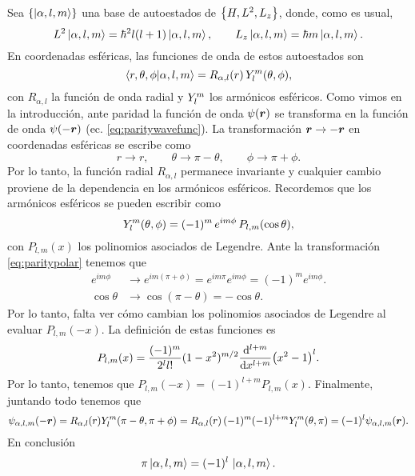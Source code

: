 \documentclass[10pt, a4paper]{article}
\newcommand{\Plmev}[2]{P_{#1,#2}}
\numberwithin{equation}{subsection}
\begin{document}
Sea $\set{\ket{\alpha,l,m}}$ una base de autoestados de $\set{H, L^2, L_z}$,
donde, como es usual,
\begin{equation}
  L^2\ket{\alpha,l,m} = \hbar^2l(l+1)\ket{\alpha,l,m}, \qquad
  L_z\ket{\alpha,l,m} = \hbar m\ket{\alpha,l,m}.
\end{equation}
En coordenadas esféricas, las funciones de onda de estos autoestados son
\begin{equation}
  \braket{r,\theta,\phi}{\alpha,l,m} =
  R_{\alpha,l}(r)\,\SphericalHarmonic{l}{m}(\theta,\phi),
\end{equation}
con $R_{\alpha,l}$ la función de onda radial y $\SphericalHarmonic{l}{m}$ los
armónicos esféricos. Como vimos en la introducción, ante paridad la función de
onda $\psi(\vb*{r})$ se transforma en la función de onda $\psi(-\vb*{r})$
(ec. \eqref{eq:paritywavefunc}). La transformación $\vb*{r} \rightarrow
-\vb*{r}$ en coordenadas esféricas se escribe como
\begin{equation} \label{eq:paritypolar}
  r \xrightarrow{\quad} r, \qquad
  \theta \xrightarrow{\quad} \pi - \theta, \qquad
  \phi \xrightarrow{\quad} \pi + \phi.
\end{equation}
Por lo tanto, la función radial $R_{\alpha,l}$ permanece invariante y cualquier
cambio proviene de la dependencia en los armónicos esféricos. Recordemos que
los armónicos esféricos se pueden escribir como
\begin{equation}
  \SphericalHarmonic{l}{m}(\theta,\phi) =
    (-1)^{m}\,e^{im\phi}\,\Plmev{l}{m}(\cos\theta),
\end{equation}
con $\Plmev{l}{m}(x)$ los polinomios asociados de Legendre. Ante la
transformación \eqref{eq:paritypolar} tenemos que
\begin{align}
  e^{im\phi} &\xrightarrow{\quad} e^{im(\pi + \phi)} = e^{im\pi}e^{im\phi} =
  (-1)^{m}e^{im\phi}. \\
  \cos\theta &\xrightarrow{\quad} \cos(\pi - \theta) = -\cos\theta.
\end{align}
Por lo tanto, falta ver cómo cambian los polinomios asociados de Legendre al
evaluar $\Plmev{l}{m}(-x)$. La definición de estas funciones es
\begin{equation}
  \Plmev{l}{m}(x) = \frac{(-1)^m}{2^ll!}(1-x^2)^{m/2} \dv[l+m]{x} (x^2 - 1)^l.
\end{equation}
Por lo tanto, tenemos que $\Plmev{l}{m}(-x) = (-1)^{l+m}\Plmev{l}{m}(x)$.
Finalmente, juntando todo tenemos que
\begin{equation}
  \psi_{\alpha,l,m}(-\vect{r}) = R_{\alpha,l}(r)\SphericalHarmonic{l}{m}(\pi -
    \theta, \pi + \phi) = R_{\alpha,l}(r)\,(-1)^m (-1)^{l+m}
    \SphericalHarmonic{l}{m}(\theta,\pi) = (-1)^l \psi_{\alpha,l,m}(\vect{r}).
\end{equation}
En conclusión
\begin{equation}
  \pi\ket{\alpha,l,m} = (-1)^l \,\ket{\alpha,l,m}.
\end{equation}
\end{document}
